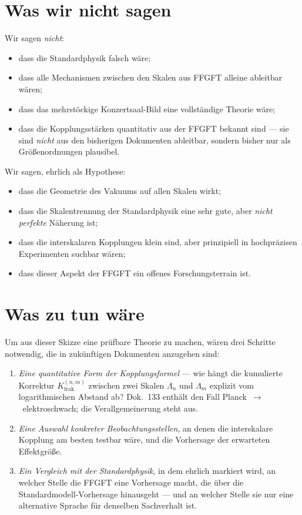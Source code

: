 \section{Was wir nicht sagen}

Wir sagen \emph{nicht}:

\begin{itemize}\setlength\itemsep{2pt}
  \item dass die Standardphysik falsch wäre;
  \item dass alle Mechanismen zwischen den Skalen aus FFGFT alleine
        ableitbar wären;
  \item dass das mehrstöckige Konzertsaal-Bild eine vollständige
        Theorie wäre;
  \item dass die Kopplungsstärken quantitativ aus der FFGFT bekannt
        sind --- sie sind \emph{nicht} aus den bisherigen Dokumenten
        ableitbar, sondern bisher nur als Größenordnungen plausibel.
\end{itemize}

Wir sagen, ehrlich als Hypothese:

\begin{itemize}\setlength\itemsep{2pt}
  \item dass die Geometrie des Vakuums auf allen Skalen wirkt;
  \item dass die Skalentrennung der Standardphysik eine sehr gute, aber
        \emph{nicht perfekte} Näherung ist;
  \item dass die interskalaren Kopplungen klein sind, aber prinzipiell
        in hochpräzisen Experimenten suchbar wären;
  \item dass dieser Aspekt der FFGFT ein offenes Forschungsterrain ist.
\end{itemize}

\section{Was zu tun wäre}

Um aus dieser Skizze eine prüfbare Theorie zu machen, wären drei
Schritte notwendig, die in zukünftigen Dokumenten anzugehen sind:

\begin{enumerate}\setlength\itemsep{2pt}
  \item \emph{Eine quantitative Form der Kopplungsformel} --- wie hängt
        die kumulierte Korrektur $K_{\mathrm{frak}}^{(n,m)}$ zwischen
        zwei Skalen $\Lambda_{n}$ und $\Lambda_{m}$ explizit vom
        logarithmischen Abstand ab? Dok.~133 enthält den Fall
        Planck~$\to$~elektroschwach; die Verallgemeinerung steht aus.
  \item \emph{Eine Auswahl konkreter Beobachtungsstellen}, an denen
        die interskalare Kopplung am besten testbar wäre, und die
        Vorhersage der erwarteten Effektgröße.
  \item \emph{Ein Vergleich mit der Standardphysik}, in dem ehrlich
        markiert wird, an welcher Stelle die FFGFT eine Vorhersage
        macht, die über die Standardmodell-Vorhersage hinausgeht ---
        und an welcher Stelle sie nur eine alternative Sprache für
        denselben Sachverhalt ist.
\end{enumerate}

